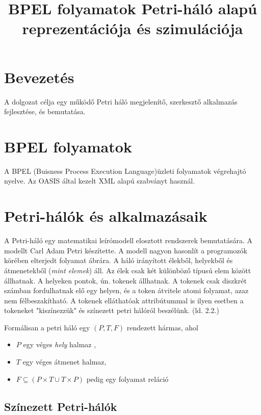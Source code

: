 \documentclass[12pt,a4paper]{book}
\date{\vspace{-5ex}}
\title{BPEL folyamatok Petri-háló alapú reprezentációja és szimulációja}
\begin{document}
\maketitle

\chapter{Bevezetés}

A dolgozat célja egy működő Petri háló  megjelenítő, szerkesztő %
alkalmazás fejlesztése, és bemutatása. %

\chapter{BPEL folyamatok}

A BPEL (Buisness Process Execution Language)üzleti folyamatok végrehajtó nyelve.
Az OASIS által kezelt XML alapú szabványt használ. 

\chapter{Petri-hálók és alkalmazásaik}

A Petri-háló egy matematikai leírómodell elosztott rendszerek bemutatására.
A modellt Carl Adam Petri készítette.
A modell nagyon hasonlít a programozók körében elterjedt folyamat ábrára.
A háló irányított élekből, helyekből és átmenetekből (\textsl{mint elemek}) áll.
Az élek csak két különböző típusú elem között állhatnak.
A helyeken pontok, ún. tokenek állhatnak.
A tokenek csak diszkrét számban fordulhatnak elő egy helyen, és a token átvitele atomi folyamat, azaz nem félbeszakítható.
A tokenek elláthatóak attribútummal is ilyen esetben a tokeneket "kiszínezzük" és színezett petri hálóról beszélünk. (ld. 2.2.) %

Formálisan  a petri háló egy \((P, T, F)\) rendezett hármas, ahol 
\begin{itemize}
\item $P$ egy véges \textsl{hely} halmaz ,
\item $T$ egy véges átmenet halmaz,
\item $F\subseteq (P\times T\cup T\times P)$ pedig egy folyamat reláció
\end{itemize}

\section{Színezett Petri-hálók}
\end{document}
